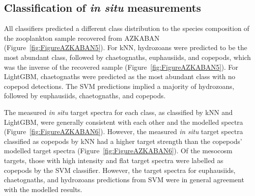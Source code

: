 \subsection{Classification of \textit{in situ} measurements}
All classifiers predicted a different class distribution to the species composition of the zooplankton sample recovered from AZKABAN (Figure~\ref{fig:FigureAZKABAN5}). For kNN, hydrozoans were predicted to be the most abundant class, followed by chaetognaths, euphausiids, and copepods, which was the inverse of the recovered sample (Figure~\ref{fig:FigureAZKABAN5}). For LightGBM, chaetognaths were predicted as the most abundant class with no copepod detections. The SVM predictions implied a majority of hydrozoans, followed by euphausiids, chaetognaths, and copepods.\\


The measured \textit{in situ} target spectra for each class, as classified by kNN and LightGBM, were generally consistent with each other and the modelled spectra (Figure~\ref{fig:FigureAZKABAN6}). However, the measured \textit{in situ} target spectra classified as copepods by kNN had a higher target strength than the copepods' modelled target spectra (Figure~\ref{fig:FigureAZKABAN6}). Of the mesocosm targets, those with high intensity and flat target spectra were labelled as copepods by the SVM classifier. However, the target spectra for euphausiids, chaetognaths, and hydrozoans predictions from SVM were in general agreement with the modelled results.\\


